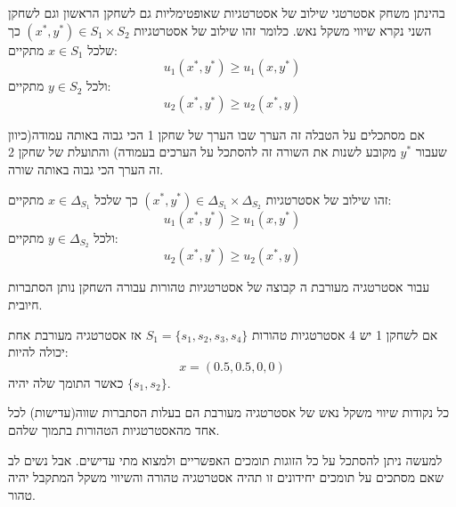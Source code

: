 \documentclass{tstextbook}
\begin{document}
\begin{definition}
בהינתן משחק אסטרטגי שילוב של אסטרטגיות שאופטימליות גם לשחקן הראשון וגם לשחקן השני נקרא שיווי משקל נאש. כלומר זהו שילוב של אסטרטגיות \((x^{*},y^{*})\in S_{1} \times S_{2}\) כך שלכל \(x \in S_{1}\) מתקיים:
$$u_{1}(x^{*},y^{*})\geq u_{1}(x,y^{*})$$
ולכל \(y \in S_{2}\) מתקיים:
$$u_{2}(x^{*},y^{*})\geq u_{2}(x^{*},y)$$

\end{definition}
\begin{remark}
אם מסתכלים על הטבלה זה הערך שבו הערך של שחקן 1 הכי גבוה באותה עמודה(כיוון שעבור \(y^{*}\) מקובע לשנות את השורה זה להסתכל על הערכים בעמודה) והתועלת של שחקן 2 זה הערך הכי גבוה באותה שורה.

\end{remark}
\begin{definition}
זהו שילוב של אסטרטגיות \((x^{*},y^{*})\in \Delta_{S_{1}} \times \Delta_{S_{2}}\) כך שלכל \(x \in \Delta _{S_{1}}\) מתקיים:
$$u_{1}(x^{*},y^{*})\geq u_{1}(x,y^{*})$$
ולכל \(y \in\Delta_{S_{2}}\) מתקיים:
$$u_{2}(x^{*},y^{*})\geq u_{2}(x^{*},y)$$

\end{definition}
\begin{definition}
עבור אסטרטגיה מעורבת ה קבוצה של אסטרטגיות טהורות עבורה השחקן נותן הסתברות חיובית.

\end{definition}
\begin{example}
אם לשחקן 1 יש 4 אסטרטגיות טהורות \(S_{1}=\{ s_{1},s_{2},s_{3},s_{4} \}\) אז אסטרטגיה מעורבת אחת יכולה להיות:
$$x=(0.5,0.5,0,0)$$
כאשר התומך שלה יהיה \(\{ s_{1},s_{2} \}\).

\end{example}
\begin{proposition}
כל נקודות שיווי משקל נאש של אסטרטגיה מעורבת הם בעלות הסתברות שווה(עדישות) לכל אחד מהאסטרטגיות הטהורות בתמוך שלהם.

\end{proposition}
\begin{remark}
למעשה ניתן להסתכל על כל הזוגות תומכים האפשריים ולמצוא מתי עדישים. אבל נשים לב שאם מסתכים על תומכים יחידונים זו תהיה אסטרטגיה טהורה והשיווי משקל המתקבל יהיה טהור.

\end{remark}
\end{document}
